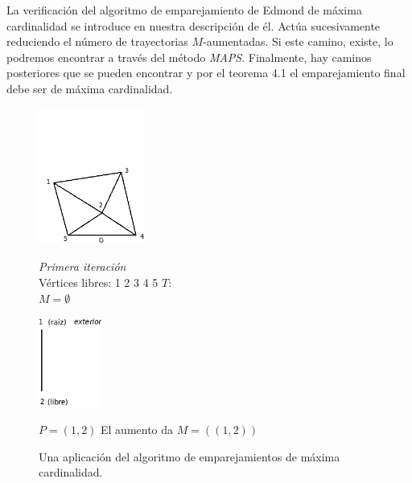 \documentclass[10pt,a5paper]{book}
\begin{document}
La verificación del algoritmo de emparejamiento de Edmond de máxima cardinalidad se introduce en nuestra descripción de él. Actúa sucesivamente reduciendo el número de trayectorias $M$-aumentadas. Si este camino, existe, lo podremos encontrar a través del método \emph{MAPS}. Finalmente, hay caminos posteriores que se pueden encontrar y por el teorema 4.1 el emparejamiento final debe ser de máxima cardinalidad.

\begin{figure}[H]
\caption{Una aplicación del algoritmo de emparejamientos de máxima cardinalidad.}
\hrulefill{}
\parbox{15cm}
{
\qquad \qquad \includegraphics[width=3.5cm]{Fig4_6_1.png}
}
\vspace*{.1in}
\parbox{6cm}
{
\emph{Primera iteración}\\
Vértices libres: 1 2 3 4 5 \qquad \quad $T:$\\
$M = \emptyset$ \\
}
\parbox{3cm}
{
\includegraphics[width=2.1cm]{Fig4_6_2.png}
}
\vspace*{.1in}
\begin{center}$P = (1,2) $ \qquad \qquad El aumento da $M = ((1,2))$\end{center}
\end{figure}
\pagebreak
\end{document}
